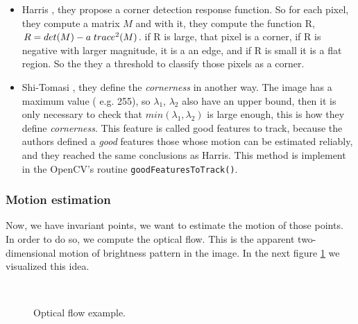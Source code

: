 \begin{itemize}

\item Harris \cite{harris}, they propose a corner detection response function. So for each pixel, they compute a matrix $M$ and with it, they compute the function
R, $R = det(M)-a \hspace{0.1cm} trace^{2}(M)$. if R is large, that pixel is a corner, if R is negative with larger magnitude, it is a an edge, and if R is small it is a 
flat region. So the they a threshold to classify those pixels as a corner. 

\item Shi-Tomasi \cite{shi}, they define the \textit{cornerness} in another way. The image has a maximum value ( e.g. 255), so $\lambda_{1}$, $\lambda_{2}$ also have an upper bound, then it is only necessary to check that $min(\lambda_{1},\lambda_{2})$ is large enough, this is how they define \textit{cornerness}. This feature is called good features to track, because the authors defined a \textit{good} features those whose motion can be estimated reliably, and they reached the same conclusions as Harris. This method is implement in the OpenCV's routine \texttt{goodFeaturesToTrack()}.

\end{itemize}

\subsubsection{Motion estimation}

Now, we have invariant points, we want to estimate the motion of those points. In order to do so, we compute the optical flow. This is the apparent two-dimensional motion of brightness pattern in the image. In the next figure \ref{refArchiteOF} we visualized this idea.


\begin{figure}[H]
		
\centering

\\


\caption{Optical flow example.}
\label{refArchiteOF}
\end{figure}


